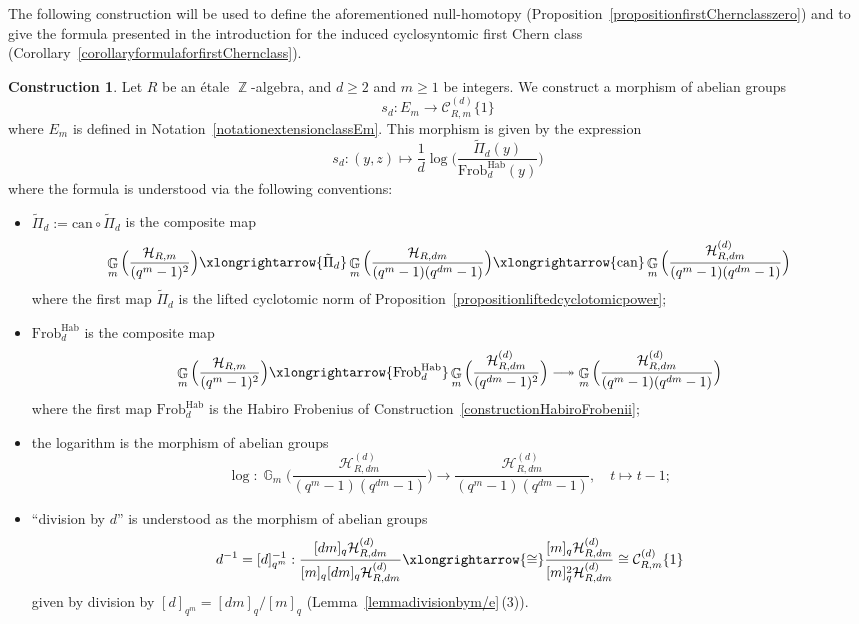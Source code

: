 \documentclass[10pt,twoside]{scrarticle}
\theoremstyle{definition}
\newtheorem{construction}[theorem]{Construction}
\DeclareMathOperator{\Z}{\mathbb{Z}}
\DeclareMathOperator{\G}{\mathbb{G}}
\newcommand{\can}{\text{can}}
\newcommand{\CRm}{\mathcal{C}_{R,m}}
\newcommand{\Frob}{\mathrm{Frob}}
\newcommand{\Hab}{\mathrm{Hab}}
\renewcommand{\ge}{\geqslant}
\numberwithin{equation}{theorem}
\begin{document}
The following construction will be used to define the aforementioned null-homotopy (Proposition~\ref{propositionfirstChernclasszero}) and to give the formula presented in the introduction for the induced cyclosyntomic first Chern class (Corollary~\ref{corollaryformulaforfirstChernclass}).

\begin{construction}\label{constructionhomotopyforfirstChernclass}
    Let $R$ be an étale $\Z$-algebra, and $d \ge 2$ and $m \ge 1$ be integers. We construct a morphism of abelian groups
    $$s_d : E_m \longrightarrow \CRm^{(d)}\{1\}$$
    where $E_m$ is defined in Notation~\ref{notationextensionclassEm}. 
    This morphism is given by the expression
    $$s_d : (y,z) \longmapsto \frac{1}{d} \log\Big(\frac{\tilde{\Pi}_d(y)}{\Frob^{\Hab}_d(y)}\Big)$$
    where the formula is understood via the following conventions: 
    \begin{itemize}
        \item $\tilde{\Pi}_d := \can\circ \tilde{\Pi}_d$ is the composite map 
         $$ \G_m\Big(\frac{\mathcal{H}_{R,m}}{(q^m-1)^2}\Big) \xlongrightarrow{\tilde{\Pi}_d } \G_m\Big(\frac{\mathcal{H}_{R,dm}}{(q^m-1)(q^{dm}-1)}\Big) \xlongrightarrow{\can} \G_m\Big(\frac{\mathcal{H}_{R,dm}^{(d)}}{(q^m-1)(q^{dm}-1)}\Big)$$
         where the first map $\tilde{\Pi}_d$ is the lifted cyclotomic norm of Proposition~\ref{propositionliftedcyclotomicpower}; 
         \item $\Frob_d^{\Hab}$ is the composite map
         $$\G_m\Big(\frac{\mathcal{H}_{R,m}}{(q^m-1)^2}\Big) \xlongrightarrow{\Frob_d^{\Hab}} \G_m\Big(\frac{\mathcal{H}_{R,dm}^{(d)}}{(q^{dm}-1)^2}\Big) \relbar\joinrel\twoheadrightarrow \G_m\Big(\frac{\mathcal{H}_{R,dm}^{(d)}}{(q^m-1)(q^{dm}-1)}\Big)$$
         where the first map $\Frob_d^{\Hab}$ is the Habiro Frobenius of Construction~\ref{constructionHabiroFrobenii}; 
    \item the logarithm is the morphism of abelian groups
    $$\log : \G_m\Big(\frac{\mathcal{H}_{R,dm}^{(d)}}{(q^m-1)(q^{dm}-1)}\Big) \longrightarrow \frac{\mathcal{H}_{R,dm}^{(d)}}{(q^m-1)(q^{dm}-1)}, \quad t\longmapsto t-1;$$
    \item ``division by $d$'' is understood as the morphism of abelian groups
    $$d^{-1} =[d]_{q^m}^{-1} : \frac{[dm]_q \mathcal{H}_{R,dm}^{(d)}}{[m]_q[dm]_q\mathcal{H}_{R,dm}^{(d)}} \xlongrightarrow{\cong} \frac{[m]_q \mathcal{H}_{R,dm}^{(d)}}{[m]_q^2\mathcal{H}_{R,dm}^{(d)}} \cong \CRm^{(d)}\{1\}$$
    given by division by $[d]_{q^m} = [dm]_q/[m]_q$ (Lemma~\ref{lemmadivisionbym/e}\,(3)).

\end{itemize}
\end{construction}
\end{document}
